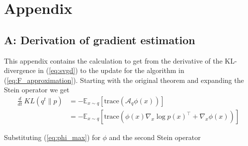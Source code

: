 \documentclass{article}
\begin{document}
\section{Appendix}
\subsection{A: Derivation of gradient estimation}
This appendix contains the calculation to get from the derivative of the KL-divergence in (\ref{eq:svgd})
to the update for the algorithm in (\ref{eq:F_approximation}).
Starting with the original theorem and expanding the Stein operator we get
\begin{align}
    \frac{d}{dt}\ KL( q^t \| p ) &= - \mathbb{E}_{x \sim q} \left[ \text{trace} \left( \mathcal{A}_q \phi(x) \right) \right] \\
         &=  - \mathbb{E}_{x \sim q} \left[ 
             \text{trace} \left( \phi(x) \nabla_x \log p(x)^\top  + \nabla_x \phi(x) \right)
         \right]\
\end{align}

Substituting (\ref{eq:phi_max}) for $\phi$ and the second Stein operator
\end{document}
